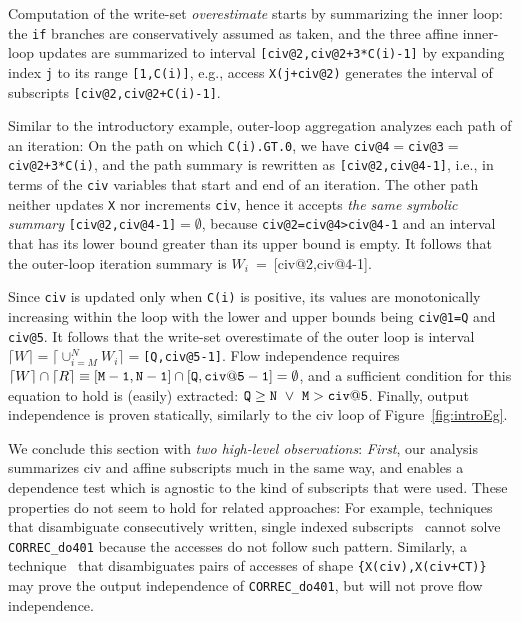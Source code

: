 \documentclass{sig-alternate}
\begin{document}
Computation of the write-set {\em overestimate} starts by summarizing 
the inner loop: the {\tt if} branches are conservatively assumed as taken, 
and  the three affine inner-loop updates  are summarized to interval
{\tt[civ@2,civ@2+3*C(i)-1]} by expanding index {\tt j} to its range 
{\tt [1,C(i)]}, e.g., access {\tt X(j+civ@2)} generates the interval 
of subscripts {\tt[civ@2,civ@2+C(i)-1]}.   

Similar to the introductory example, outer-loop aggregation
analyzes each path of an iteration:
On the path on which {\tt C(i).GT.0}, we have %
{\tt civ@4$=$civ@3$=$civ@2+3*C(i)}, and the path summary is
rewritten as {\tt [civ@2,civ@4-1]}, i.e., in terms of the {\tt civ}
variables that start and end of an iteration. The other path neither 
updates {\tt X} nor increments {\tt civ}, hence it accepts 
{\em the same symbolic summary} {\tt[civ@2,civ@4-1]$=\emptyset$}, 
because {\tt{}civ@2=civ@4>civ@4-1} and an interval that has its lower 
bound greater than its upper bound is empty.
%
It follows that the outer-loop iteration summary is
{$W_i$~=~[civ@2,civ@4-1]}.

Since {\tt civ} is updated only when {\tt C(i)} is positive,
its values are monotonically increasing within the loop with
the lower and upper bounds being {\tt civ@1=Q} and {\tt civ@5}. 
It follows that the write-set overestimate of the outer loop is 
interval $\lceil W \rceil = \lceil \cup_{i=M}^{N}W_i\rceil =${\tt[Q,civ@5-1]}.
Flow independence requires   
$\lceil W\rceil\cap\lceil R \rceil \equiv {\tt [M-1,N-1]}\cap{\tt{}[Q,civ@5-1]}=\emptyset$,
and a sufficient condition for this equation to hold is (easily) extracted:
${\tt Q} \ge {\tt N}~\vee~{\tt M} > {\tt{}civ@5}$.
%
Finally, output independence is proven statically, similarly to the 
{\sc civ} loop of Figure~\ref{fig:introEg}.

\vspace{1ex}
We conclude this section with {\em two high-level observations}: %
{\em First}, our analysis summarizes {\sc civ} and affine subscripts
much in the same way, and enables a dependence test which is agnostic
to the kind of subscripts that were used.
%
These properties do not seem to hold for related approaches: 
For example, techniques that disambiguate consecutively written,
single indexed subscripts~\cite{PaduaDemDrInterproc,VEG} cannot solve
{\tt CORREC\_do401} because the accesses do not follow such pattern.
Similarly, a technique~\cite{CohenBeyondMon} that disambiguates 
pairs of accesses of shape {\tt \{X(civ),X(civ+CT)\}} may prove the output 
independence of {\tt CORREC\_do401}, but will not prove flow independence. 
%
\end{document}
